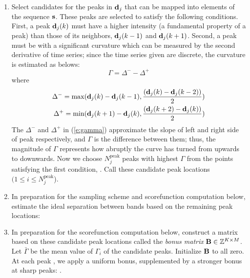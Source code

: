 \begin{enumerate}
\item Select candidates for the peaks in ${\mathbf{d}}_j$ that can be mapped into elements of the sequence ${\mathbf{s}}$. These peaks are selected to satisfy the following conditions. First, a peak ${\mathbf{d}}_j(k)$ must have a higher intensity (a fundamental property of a peak) than those of its neighbors, ${\mathbf{d}}_j(k-1)$ and ${\mathbf{d}}_j(k+1)$. Second, a peak must be with a significant curvature which can be measured by the second derivative of time series; since the time series given are discrete, the curvature is estimated as belows:
%
\begin{equation}\label{e:gamma}
\Gamma = \Delta^- - \Delta^+
\end{equation}
%
where
%
\begin{eqnarray}
\Delta^- = \max( {\mathbf{d}}_j(k)-{\mathbf{d}}_j(k-1), {{({\mathbf{d}}_j(k)-{\mathbf{d}}_j(k-2))}\over{2}}) \nonumber \\
\Delta^+ = \min( {\mathbf{d}}_j(k+1)-{\mathbf{d}}_j(k), {{({\mathbf{d}}_j(k+2)-{\mathbf{d}}_j(k))}\over{2}}) \nonumber
\end{eqnarray}
%
The $\Delta^-$ and $\Delta^+$ in (\ref{e:gamma}) approximate the slope of left and right side of peak respectively, and $\Gamma$ is the difference between them; thus, the magnitude of $\Gamma$ represents how abruptly the curve has turned from upwards to downwards. Now we choose $N^\textrm{peak}_j$ peaks with highest $\Gamma$ from the points satisfying the first condition, . Call these candidate peak locations  $(1 \le i \le N^\textrm{peak}_j$).

\item In preparation for the sampling scheme and scorefunction computation below, estimate the ideal separation between bands based on the remaining peak locations: %

\item In preparation for the scorefunction computation below, construct a matrix based on these candidate peak locations called the \emph{bonus matrix} ${\mathbf{B}} \in \mathbb{Z}^{K \times M}$. Let $\bar{\Gamma}$ be the mean value of $\Gamma_i$ of the candidate peaks. Initialize ${\mathbf{B}}$ to all zero. At each peak , we apply a uniform bonus, supplemented by a stronger bonus at sharp peaks: .


\end{enumerate}

